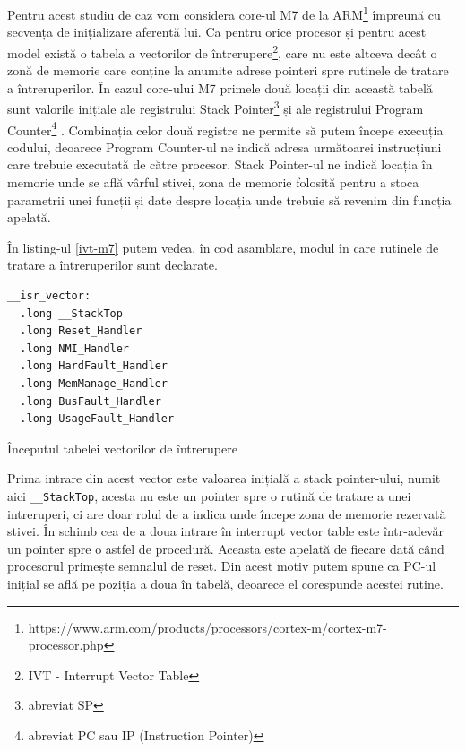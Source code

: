 \documentclass[12pt,a4paper,titlepage]{report}
\begin{document}
Pentru acest studiu de caz vom considera core-ul M7 de la ARM\footnote{https://www.arm.com/products/processors/cortex-m/cortex-m7-processor.php} împreună cu secvența de inițializare aferentă lui.
Ca pentru orice procesor și pentru acest model există o tabela a vectorilor de întrerupere\footnote{IVT - Interrupt Vector Table}, care nu este altceva decât o zonă de memorie care conține la anumite adrese pointeri spre rutinele de tratare a întreruperilor. În cazul core-ului M7 primele două locații din această tabelă sunt valorile inițiale ale registrului Stack Pointer\footnote{abreviat SP} și ale registrului Program Counter\footnote{abreviat PC sau IP (Instruction Pointer)} \cite{kv5x}.
Combinația celor două registre ne permite să putem începe execuția codului, deoarece Program Counter-ul ne indică adresa următoarei instrucțiuni care trebuie executată de către procesor. Stack Pointer-ul ne indică locația în memorie unde se află vârful stivei, zona de memorie folosită pentru a stoca parametrii unei funcții și date despre locația unde trebuie să revenim din funcția apelată.

În listing-ul \ref{ivt-m7} putem vedea, în cod asamblare, modul în care rutinele de tratare a întreruperilor sunt declarate.
\begin{listing}[h]
\begin{verbatim}
__isr_vector:
  .long __StackTop
  .long Reset_Handler
  .long NMI_Handler
  .long HardFault_Handler
  .long MemManage_Handler
  .long BusFault_Handler
  .long UsageFault_Handler
\end{verbatim}

\caption{Începutul tabelei vectorilor de întrerupere}
\label{ivt-m7}
\end{listing}

Prima intrare din acest vector este valoarea inițială a stack pointer-ului, numit aici \texttt{\_\_StackTop}, acesta nu este un pointer spre o rutină de tratare a unei intreruperi, ci are doar rolul de a indica unde începe zona de memorie rezervată stivei. În schimb cea de a doua intrare în interrupt vector table este într-adevăr un pointer spre o astfel de procedură.
Aceasta este apelată de fiecare dată când procesorul primește semnalul de reset. Din acest motiv putem spune ca PC-ul inițial se află pe poziția a doua în tabelă, deoarece el corespunde acestei rutine.
\end{document}
